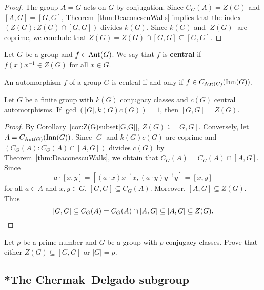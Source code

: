 \begin{proof}
	The group $A=G$ acts on $G$ by conjugation. Since $C_G(A)=Z(G)$ and 
	$[A,G]=[G,G]$, Theorem~\ref{thm:DeaconescuWalls} implies that the index 
	$(Z(G):Z(G)\cap [G,G])$ divides $k(G)$. Since $k(G)$ and $|Z(G)|$ are coprime, we conclude that $Z(G)=Z(G)\cap [G,G]\subseteq [G,G]$. 
\end{proof}

\begin{definition}
 	Let $G$ be a group and $f\in\operatorname{Aut}(G)$. We say that $f$ is \textbf{central} if 
	$f(x)x^{-1}\in Z(G)$ for all $x\in G$.
\end{definition}

An automorphism $f$ of a group $G$ 
is central if and only if $f\in C_{\operatorname{Aut}(G)}(\operatorname{Inn}(G))$.

\begin{corollary}
	Let $G$ be a finite group with $k(G)$ conjugacy classes and $c(G)$
	central automorphisms. If $\gcd(|G|,k(G)c(G))=1$, then 
	$[G,G]=Z(G)$.
\end{corollary}

\begin{proof}
	By Corollary~\ref{cor:Z(G)subset[G,G]}, $Z(G)\subseteq [G,G]$. Conversely, let 
	$A=C_{\operatorname{Aut}(G)}(\operatorname{Inn}(G))$. Since $|G|$ and $k(G)c(G)$ are coprime 
	and $(C_G(A):C_G(A)\cap [A,G])$ divides $c(G)$ by 
	Theorem~\ref{thm:DeaconescuWalls}, we obtain that $C_G(A)=C_G(A)\cap [A,G]$. 
	Since 
	\[
		a\cdot [x,y]=[(a\cdot x)x^{-1}x,(a\cdot y)y^{-1}y]=[x,y]
	\]
	for all $a\in A$ and $x,y\in G$, 
    $[G,G]\subseteq C_G(A)$. Moreover, 
    $[A,G]\subseteq Z(G)$. Thus 
	\[
	[G,G]\subseteq C_G(A)=C_G(A)\cap [A,G]\subseteq [A,G]\subseteq Z(G).\qedhere 
	\]
\end{proof}

\begin{exercise}
    Let $p$ be a prime number and $G$ be a group with $p$ conjugacy classes. 
    Prove that either $Z(G)\subseteq[G,G]$ or $|G|=p$. 
\end{exercise}



\subsection{*The Chermak--Delgado subgroup}

